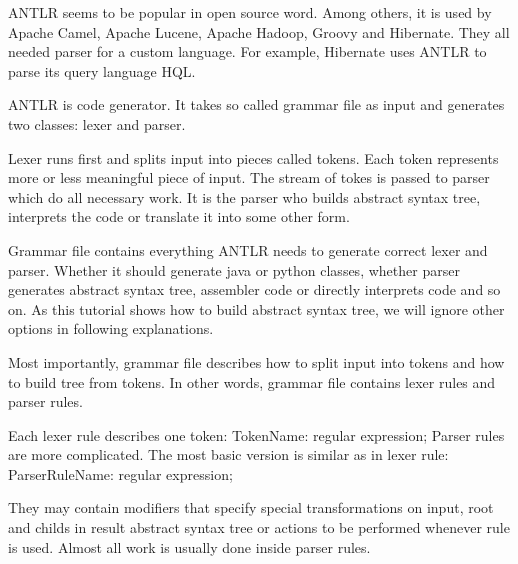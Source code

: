 ANTLR seems to be popular in open source word. Among others, it is used by Apache Camel, Apache Lucene, Apache Hadoop, Groovy and Hibernate. They all needed parser for a custom language. For example, Hibernate uses ANTLR to parse its query language HQL.

ANTLR is code generator. It takes so called grammar file as input and generates two classes: lexer and parser.

Lexer runs first and splits input into pieces called tokens. Each token represents more or less meaningful piece of input. The stream of tokes is passed to parser which do all necessary work. It is the parser who builds abstract syntax tree, interprets the code or translate it into some other form.

Grammar file contains everything ANTLR needs to generate correct lexer and parser. Whether it should generate java or python classes, whether parser generates abstract syntax tree, assembler code or directly interprets code and so on. As this tutorial shows how to build abstract syntax tree, we will ignore other options in following explanations.

Most importantly, grammar file describes how to split input into tokens and how to build tree from tokens. In other words, grammar file contains lexer rules and parser rules.

Each lexer rule describes one token: TokenName: regular expression; Parser rules are more complicated. The most basic version is similar as in lexer rule: ParserRuleName: regular expression;  

They may contain modifiers that specify special transformations on input, root and childs in result abstract syntax tree or actions to be performed whenever rule is used. Almost all work is usually done inside parser rules.